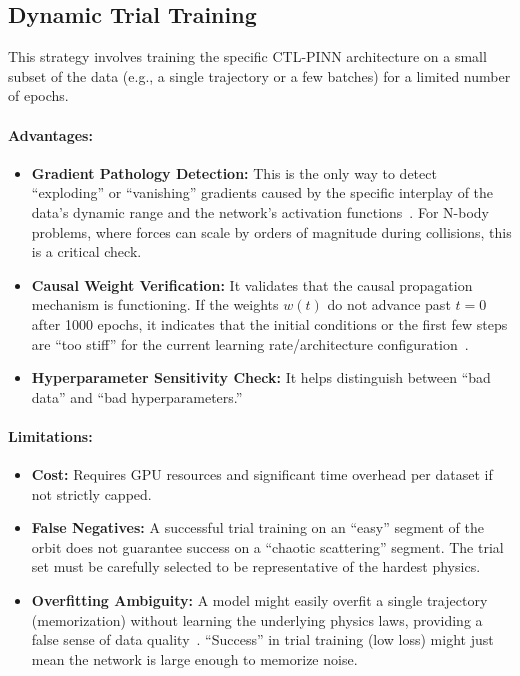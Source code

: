 \documentclass[11pt, a4paper]{article}
\begin{document}
\subsection{Dynamic Trial Training}

This strategy involves training the specific CTL-PINN architecture on a small subset of the data (e.g., a single trajectory or a few batches) for a limited number of epochs.

\paragraph{Advantages:}
\begin{itemize}
    \item \textbf{Gradient Pathology Detection:} This is the only way to detect ``exploding'' or ``vanishing'' gradients caused by the specific interplay of the data's dynamic range and the network's activation functions~\cite{ref14}. For N-body problems, where forces can scale by orders of magnitude during collisions, this is a critical check.
    \item \textbf{Causal Weight Verification:} It validates that the causal propagation mechanism is functioning. If the weights $w(t)$ do not advance past $t=0$ after 1000 epochs, it indicates that the initial conditions or the first few steps are ``too stiff'' for the current learning rate/architecture configuration~\cite{ref10}.
    \item \textbf{Hyperparameter Sensitivity Check:} It helps distinguish between ``bad data'' and ``bad hyperparameters.''
\end{itemize}

\paragraph{Limitations:}
\begin{itemize}
    \item \textbf{Cost:} Requires GPU resources and significant time overhead per dataset if not strictly capped.
    \item \textbf{False Negatives:} A successful trial training on an ``easy'' segment of the orbit does not guarantee success on a ``chaotic scattering'' segment. The trial set must be carefully selected to be representative of the hardest physics.
    \item \textbf{Overfitting Ambiguity:} A model might easily overfit a single trajectory (memorization) without learning the underlying physics laws, providing a false sense of data quality~\cite{ref18}. ``Success'' in trial training (low loss) might just mean the network is large enough to memorize noise.
\end{itemize}
\end{document}
